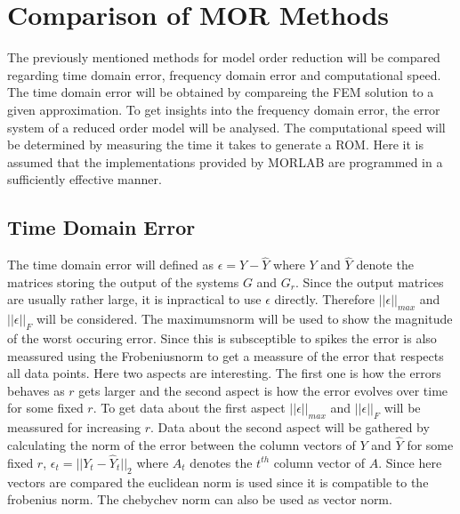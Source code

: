 \chapter{Comparison of MOR Methods} \label{analysis}
The previously mentioned methods for model order reduction will be compared regarding time domain error, frequency domain error and computational speed.
The time domain error will be obtained by compareing the FEM solution to a given approximation.
To get insights into the frequency domain error, the error system of a reduced order model will be analysed.
The computational speed will be determined by measuring the time it takes to generate a ROM.
Here it is assumed that the implementations provided by MORLAB are programmed in a sufficiently effective manner.
\section{Time Domain Error}
The time domain error will defined as \(\epsilon = Y - \hat{Y}\) where \(Y\) and \(\hat{Y}\) denote the matrices storing the output of the systems \(G\) and \(G_r\).
Since the output matrices are usually rather large, it is inpractical to use \(\epsilon\) directly.
Therefore  \(||\epsilon||_{max}\)  and \(||\epsilon||_{F}\)  will be considered.
The maximumsnorm will be used to show the magnitude of the worst occuring error.
Since this is subsceptible to spikes the error is also meassured using the Frobeniusnorm to get a meassure of the error that respects all data points.
Here two aspects are interesting.
The first one is how the errors behaves as \(r\) gets larger and the second aspect is how the error evolves over time for some fixed \(r\).
To get data about the first aspect \(||\epsilon||_{max}\)  and \(||\epsilon||_{F}\) will be meassured for increasing \(r\).
Data about the second aspect will be gathered by calculating the norm of the error between the column vectors of \(Y\) and \(\hat{Y}\) for some fixed \(r\), \(\epsilon_{t} = ||Y_t - \hat{Y}_t||_{2}\) where \(A_t\) denotes the \(t^{th}\) column vector of \(A\).
Since here vectors are compared the euclidean norm is used since it is compatible to the frobenius norm.
The chebychev norm can also be used as vector norm.

